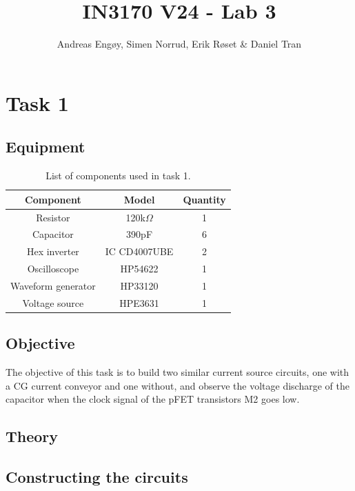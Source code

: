 \documentclass[onecolumn]{article}
\title{IN3170 V24 - Lab 3}
\author{Andreas Engøy, Simen Norrud, Erik Røset \& Daniel Tran}
\date{\monthname[\the\month] \the\year}
\begin{document}
\maketitle


\section{Task 1}
\subsection{Equipment}
\begin{table}[h]
    \centering
    \begin{tabular}{|c|c|c|}
        \hline
        \textbf{Component} & \textbf{Model} & \textbf{Quantity} \\
        \hline
        Resistor & 120k$\Omega$ & 1 \\
        Capacitor & 390pF & 6 \\
        Hex inverter & IC CD4007UBE & 2 \\
        Oscilloscope & HP54622 & 1 \\
        Waveform generator  & HP33120 & 1\\
        Voltage source & HPE3631 & 1 \\
        \hline
    \end{tabular}
    \caption{List of components used in task 1.}
    \label{tab:bom}
\end{table}

\subsection{Objective}
The objective of this task is to build two similar current source circuits, one with a CG current conveyor and one without, and observe the voltage discharge of the capacitor when the clock signal of the pFET transistors M2 goes low.  

\subsection{Theory}


\subsection{Constructing the circuits}
\end{document}
